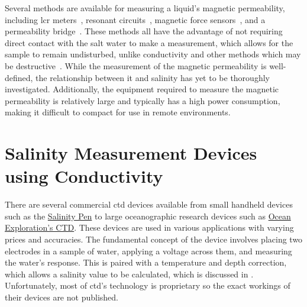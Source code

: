 Several methods are available for measuring a liquid's magnetic permeability, including \gls{lcr} meters~\cite{waltrip_inductance_measurement_2005}, resonant circuits~\cite{alhassoon_complex_permittivity_extraction_2021}, magnetic force sensors~\cite{pattakos_magnetic_permeability_sensor_2023}, and a permeability bridge~\cite{ewing_magnetic_balance_permeability_1898}.
These methods all have the advantage of not requiring direct contact with the salt water to make a measurement, which allows for the sample to remain undisturbed, unlike conductivity and other methods which may be destructive~\cite{tengesdal_electromagnetic_salinity_2014}.
While the measurement of the magnetic permeability is well-defined, the relationship between it and salinity has yet to be thoroughly investigated.
Additionally, the equipment required to measure the magnetic permeability is relatively large and typically has a high power consumption, making it difficult to compact for use in remote environments.

\section{Salinity Measurement Devices using Conductivity}\label{sec:salinity-measurement-devices}

There are several commercial \gls{ctd} devices available from small handheld devices such as the \href{https://euca.co.za/products/salinity-pen?srsltid=AfmBOorAK21_xoeOZbaqoqXbRzrLxF5Yx47nzn7tvsve-_Azl3sSh1-QbIg}{Salinity Pen} to large oceanographic research devices such as \href{https://oceanexplorer.noaa.gov/technology/ctd/ctd.html}{Ocean Exploration's CTD}.
These devices are used in various applications with varying prices and accuracies. 
The fundamental concept of the device involves placing two electrodes in a sample of water, applying a voltage across them, and measuring the water's response.
This is paired with a temperature and depth correction, which allows a salinity value to be calculated, which is discussed in .
Unfortunately, most of \gls{ctd}'s technology is proprietary so the exact workings of their devices are not published.

